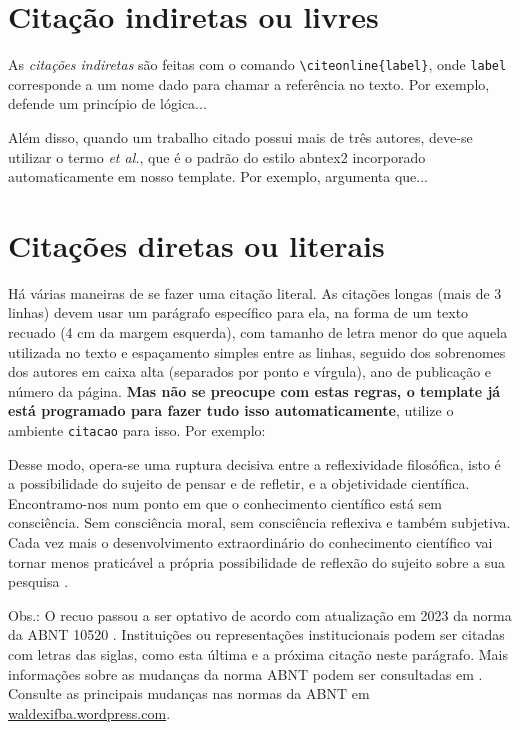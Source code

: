 \section{Citação indiretas ou livres}\label{ciação direta}
As \textit{citações indiretas} são feitas com o comando \verb|\citeonline{label}|, onde \verb|label| corresponde a um nome dado para chamar a referência no texto. Por exemplo,  defende um princípio de lógica...

Além disso, quando um trabalho citado possui mais de três autores, deve-se utilizar o termo \textit{et al.}, que é o padrão do estilo {\ttfamily abntex2} incorporado automaticamente em nosso template. Por exemplo,  argumenta que...

\section{Citações diretas ou literais}\label{citacoesdiretas}
Há várias maneiras de se fazer uma citação literal. As citações longas (mais de 3 linhas) devem usar um parágrafo específico para ela, na forma de um texto recuado (4 cm da margem esquerda), com tamanho de letra menor do que aquela utilizada no texto e espaçamento simples entre as linhas, seguido dos sobrenomes dos autores em caixa alta (separados por ponto e vírgula), ano de publicação e número da página. \textbf{Mas não se preocupe com estas regras, o template já está programado para fazer tudo isso automaticamente}, utilize o ambiente \texttt{citacao} para isso. Por exemplo:
\begin{citacao}
Desse modo, opera-se uma ruptura decisiva entre a reflexividade filosófica, isto 	é a possibilidade do sujeito de pensar e de refletir, e a objetividade científica.
Encontramo-nos num ponto em que o conhecimento científico está sem consciência.
Sem consciência moral, sem consciência reflexiva e também subjetiva.
Cada vez mais o desenvolvimento extraordinário do conhecimento científico vai tornar menos praticável a própria possibilidade de reflexão do sujeito sobre a sua pesquisa \cite[p.~28]{morinmoigne:2000}.
\end{citacao}

Obs.: O recuo passou a ser optativo de acordo com atualização em 2023 da norma da ABNT 10520 \cite{NBR10520:2023}. Instituições ou representações institucionais podem ser citadas com letras das siglas, como esta última e a próxima citação neste parágrafo. Mais informações sobre as mudanças da norma ABNT podem ser consultadas em . Consulte as principais mudanças nas normas da ABNT em \href{https://waldexifba.wordpress.com/2024/07/26/norma-abnt-principais-mudancas-e-atualizacoes-em-citacoes/}{waldexifba.wordpress.com}.

